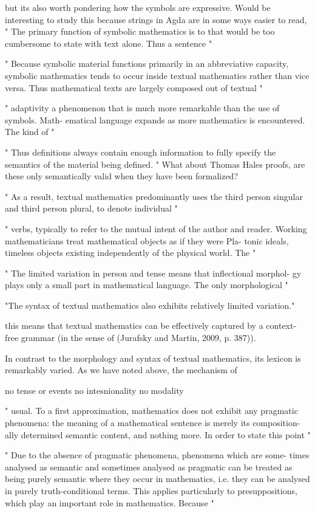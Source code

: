 but its also worth pondering
how the symbols are expressive. Would be interesting to study this because strings in Agda are in some ways easier
to read,
"
The primary function of symbolic mathematics is to 
that would be too cumbersome to state with text alone. Thus a sentence
"

"
Because symbolic material functions primarily in an abbreviative capacity,
symbolic mathematics tends to occur inside textual mathematics rather than
vice versa. Thus mathematical texts are largely composed out of textual
"

"
adaptivity
a phenomenon that is much more remarkable than the use of symbols. Math-
ematical language expands as more mathematics is encountered. The kind of
"

"
Thus definitions always contain enough information to fully specify the
semantics of the material being defined.
"
What about Thomas Hales proofs, are these only semantically valid when they have
been formalized?


"
As a result, textual mathematics predominantly
uses the third person singular and third person plural, to denote individual
"

"
verbs, typically to refer to the mutual intent of the author and reader.
Working mathematicians treat mathematical objects as if they were Pla-
tonic ideals, timeless objects existing independently of the physical world. The
"

"
The limited variation in person and tense means that inflectional morphol-
gy plays only a small part in mathematical language. The only morphological
"

"The syntax of textual mathematics also exhibits relatively limited variation."


this means that textual mathematics can be effectively captured by a context-
free grammar (in the sense of (Jurafsky and Martin, 2009, p. 387)).

In contrast to the morphology and syntax of textual mathematics, its
lexicon is remarkably varied. As we have noted above, the mechanism of

no tense or events
no intesnionality
no modality

"
usual. To a first approximation, mathematics does not exhibit any pragmatic
phenomena: the meaning of a mathematical sentence is merely its composition-
ally determined semantic content, and nothing more. In order to state this point
"


"
Due to the absence of pragmatic phenomena, phenomena which are some-
times analysed as semantic and sometimes analysed as pragmatic can be
treated as being purely semantic where they occur in mathematics, i.e. they
can be analysed in purely truth-conditional terms. This applies particularly
to presuppositions, which play an important role in mathematics. Because
"

